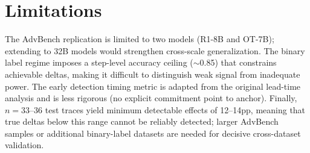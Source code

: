\documentclass[11pt]{article}
\begin{document}
\section*{Limitations}

The AdvBench replication is limited to two models (R1-8B and OT-7B); extending to 32B models would strengthen cross-scale generalization. The binary label regime imposes a step-level accuracy ceiling ($\sim$0.85) that constrains achievable deltas, making it difficult to distinguish weak signal from inadequate power. The early detection timing metric is adapted from the original lead-time analysis and is less rigorous (no explicit commitment point to anchor). Finally, $n{=}33$--36 test traces yield minimum detectable effects of 12--14pp, meaning that true deltas below this range cannot be reliably detected; larger AdvBench samples or additional binary-label datasets are needed for decisive cross-dataset validation.



\end{document}
